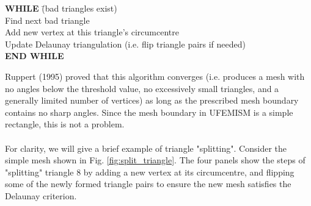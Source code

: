 \documentclass{article}
\begin{document}
\begin{tabbing}
\textbf{WHILE} \=(bad triangles exist)\\
\> Find next bad triangle\\
\> Add new vertex at this triangle's circumcentre\\
\> Update Delaunay triangulation (i.e. flip triangle pairs if needed)\\
\textbf{END WHILE}
\end{tabbing}

Ruppert (1995) proved that this algorithm converges (i.e. produces a mesh with no angles below the threshold value, no excessively small triangles, and a generally limited number of vertices) as long as the prescribed mesh boundary contains no sharp angles. Since the mesh boundary in UFEMISM is a simple rectangle, this is not a problem.\\
\\
For clarity, we will give a brief example of triangle "splitting". Consider the simple mesh shown in Fig. \ref{fig:split_triangle}. The four panels show the steps of "splitting" triangle 8 by adding a new vertex at its circumcentre, and flipping some of the newly formed triangle pairs to ensure the new mesh satisfies the Delaunay criterion.
\end{document}
